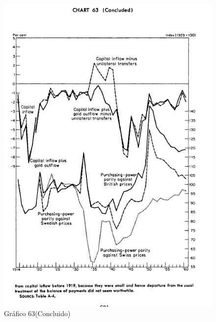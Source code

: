 \documentclass[a4paper,12pt]{article}[abntex2]
\begin{document}
\begin{figure}[H]
    \centering
    \caption{Gráfico 63(Concluido)}
    \includegraphics[width=1.0\textwidth]{4º Período/História do Pensamento Econômico/Tradução HPE/Tradução Tópico 9.1/Gráfico 63(Concluido).png}
    \end{figure}
\end{document}
